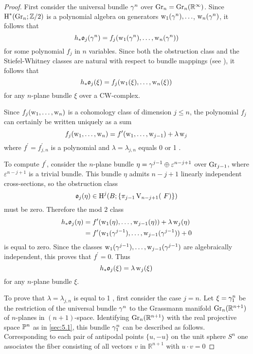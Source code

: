 \documentclass[../main]{subfiles}
\begin{document}
\begin{proof} First consider the universal bundle $\gamma^{n}$ over $\operatorname{Gr}_{n}=\operatorname{Gr}_{n}(\mathbb{R}^{\infty})$. Since $\operatorname{H}^{*}(\operatorname{Gr}_n ; \mathbb{Z} / 2)$ is a polynomial algebra on generators $\operatorname{w}_{1}(\gamma^{n}), \ldots$, $\operatorname{w}_{n}(\gamma^{n})$, it follows that
\[
h_{*} \mathfrak{o}_{j}(\gamma^{n})=f_{j}(\operatorname{w}_{1}(\gamma^{n}), \ldots, \operatorname{w}_{n}(\gamma^{n}))
\]
for some polynomial $f_{j}$ in $n$ variables. Since both the obstruction class and the Stiefel-Whitney classes are natural with respect to bundle mappings (see \cite[\S 35.7]{steenrod1951}), it follows that
\[
h_{*} \mathfrak{o}_{j}(\xi)=f_{j}(\operatorname{w}_{1}(\xi), \ldots, \operatorname{w}_{n}(\xi))
\]
for any $n$-plane bundle $\xi$ over a CW-complex.

Since $f_{j}(\operatorname{w}_{1}, \ldots, \operatorname{w}_{n})$ is a cohomology class of dimension $j \leq n$, the polynomial $f_{j}$ can certainly be written uniquely as a sum
\[
f_{j}(\operatorname{w}_{1}, \ldots, \operatorname{w}_{n})=f^{\prime}(\operatorname{w}_{1}, \ldots, \operatorname{w}_{j-1})+\lambda \operatorname{w}_{j}
\]
where $f^{\prime}=f_{j, n}^{\prime}$ is a polynomial and $\lambda=\lambda_{j, n}$ equals 0 or 1 .

To compute $f^{\prime}$, consider the $n$-plane bundle $\eta=\gamma^{j-1} \oplus \varepsilon^{n-j+1}$ over $\operatorname{Gr}_{j-1}$, where $\varepsilon^{n-j+1}$ is a trivial bundle. This bundle $\eta$ admits $n-j+1$ linearly independent cross-sections, so the obstruction class
\[
\mathfrak{o}_{j}(\eta) \in \operatorname{H}^{j}(B ;\{\pi_{j-1}\operatorname{V}_{n-j+1}(~F)\})
\]
must be zero. Therefore the mod $2$ class
\[
\begin{aligned}
h_{*} \mathfrak{o}_{j}(\eta) &=f^{\prime}(\operatorname{w}_{1}(\eta), \ldots, \operatorname{w}_{j-1}(\eta))+\lambda \operatorname{w}_{j}(\eta) \\
&=f^{\prime}(\operatorname{w}_{1}(\gamma^{j-1}), \ldots, \operatorname{w}_{j-1}(\gamma^{j-1}))+0
\end{aligned}
\]
is equal to zero. Since the classes $\operatorname{w}_{1}(\gamma^{j-1}), \ldots, \operatorname{w}_{j-1}(\gamma^{j-1})$ are algebraically independent, this proves that $f^{\prime}=0$. Thus
\[
h_{*} \mathfrak{o}_{j}(\xi)=\lambda \operatorname{w}_{j}(\xi)
\]
for any $n$-plane bundle $\xi$.

To prove that $\lambda=\lambda_{j, n}$ is equal to 1 , first consider the case $j=n$. Let $\xi=\gamma_{1}^{n}$ be the restriction of the universal bundle $\gamma^{n}$ to the Grassmann manifold $\operatorname{Gr}_n(\mathbb{R}^{n+1})$ of $n$-planes in $(n+1)$-space. Identifying $\operatorname{Gr}_n(\mathbb{R}^{n+1})$ with the real projective space $\mathbb{P}^{n}$ as in \ref{sec:5.1}, this bundle $\gamma_{1}^{n}$ can be described as follows. Corresponding to each pair of antipodal points $\{u,-u\}$ on the unit sphere $S^{n}$ one associates the fiber consisting of all vectors $v$ in $\mathbb{R}^{n+1}$ with $u \cdot v=0$


\end{proof}
\end{document}

